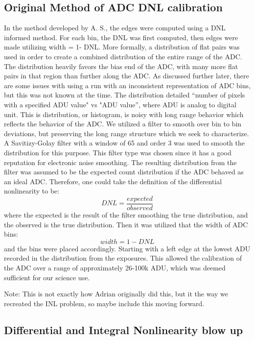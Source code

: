 \documentclass[11pt, letterpaper]{article}
\begin{document}
\subsection{Original Method of ADC DNL calibration}
\indent


In the method developed by A. S.,  the edges were computed using a DNL informed method. For each bin, the DNL was first computed, then edges were made utilizing width = 1- DNL. 
More formally, a distribution of flat pairs was used in order to create a combined distribution of the entire range of the ADC. 
The distribution heavily favors the bias end of the ADC, with many more flat pairs in that region than further along the ADC. 
As discussed further later, there are some issues with using a run with an inconsistent representation of ADC bins, but this was not known at the time.
 The distribution detailed “number of pixels with a specified ADU value" vs "ADU value”, where ADU is analog to digital unit. 
 This is distribution, or histogram, is noisy with long range behavior which reflects the behavior of the ADC. 
 We utilized a filter to smooth over bin to bin deviations, but preserving the long range structure which we seek to characterize.  
A Savitizy-Golay filter with a window of 65 and order 3 was used to smooth the distribution for this purpose. 
 This filter type was chosen since it has a good reputation for electronic noise smoothing. 
 The resulting distribution from the filter was assumed to be the expected count distribution if the ADC behaved as an ideal ADC.  
 Therefore, one could take the definition of the differential nonlinearity to be:
 \[ DNL = \frac{expected}{observed}\]
where the expected is the result of the filter smoothing the true distribution, and the observed is the true distribution. 
Then it was utilized that the width of ADC bins:
\[ width = 1 - DNL\]  
 and the bins were placed accordingly. 
 Starting with a left edge at the lowest ADU recorded in the distribution from the exposures. 
 This allowed the calibration of the ADC over a range of approximately 26-100k ADU, which was deemed sufficient for our science use. 

Note: This is not exactly how Adrian originally did this, but it the way we recreated the INL problem, so maybe include this moving forward. 

\subsection{Differential and Integral Nonlinearity blow up}
\indent
\end{document}
